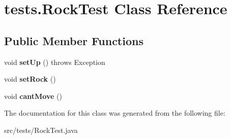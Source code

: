 \hypertarget{classtests_1_1_rock_test}{\section{tests.\-Rock\-Test Class Reference}
\label{classtests_1_1_rock_test}
}
\subsection*{Public Member Functions}
\begin{DoxyCompactItemize}
\item 
\hypertarget{classtests_1_1_rock_test_a62ac44dde9bf2da150651d6b7abad4c8}{void {\bfseries set\-Up} ()  throws Exception }\label{classtests_1_1_rock_test_a62ac44dde9bf2da150651d6b7abad4c8}

\item 
\hypertarget{classtests_1_1_rock_test_a65c8c7e1ba236c999f5108dac4bebbd8}{void {\bfseries set\-Rock} ()}\label{classtests_1_1_rock_test_a65c8c7e1ba236c999f5108dac4bebbd8}

\item 
\hypertarget{classtests_1_1_rock_test_acac906308a93a416603769d82346e20c}{void {\bfseries cant\-Move} ()}\label{classtests_1_1_rock_test_acac906308a93a416603769d82346e20c}

\end{DoxyCompactItemize}


The documentation for this class was generated from the following file\-:\begin{DoxyCompactItemize}
\item 
src/tests/Rock\-Test.\-java\end{DoxyCompactItemize}

